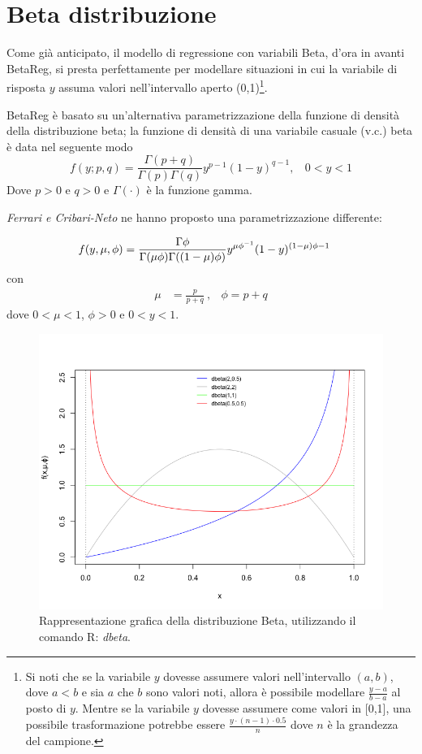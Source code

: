 \documentclass[twoside,twocolumn]{article}
\begin{document}
	\section{Beta distribuzione}
	Come già anticipato, il modello di regressione con variabili Beta, d'ora in avanti BetaReg, si presta perfettamente per modellare situazioni in cui la variabile di risposta $y$ assuma valori nell'intervallo aperto (0,1)\footnote{Si noti che se la variabile $y$ dovesse assumere valori nell'intervallo $(a,b)$, dove $a < b$ e sia $a$ che $b$ sono valori noti, allora è possibile modellare $\frac{y-a}{b-a}$ al posto di $y$. Mentre se la variabile $y$ dovesse assumere come valori in [0,1], una possibile trasformazione potrebbe essere $\frac{y\cdot (n-1) \cdot 0.5}{n}$ dove $n$ è la grandezza del campione.}. 
	
	BetaReg è basato su un'alternativa parametrizzazione della funzione di densità della distribuzione beta;
	la funzione di densità di una variabile casuale (v.c.) beta è data nel seguente modo
	$$f(y;p,q)=\frac{\Gamma(p+q)}{\Gamma(p)\Gamma(q)}y^{p-1}(1-y)^{q-1},\ \ \ \ 0 <y<1$$ 
	Dove $p>0$ e $q>0$ e $\Gamma(\cdot)$ è la funzione gamma. 
	
	\emph{Ferrari e Cribari-Neto} ne hanno proposto una parametrizzazione differente:

	$$
		\hspace{-4mm}
	f(y,\mu,\phi)=\frac{\Gamma{\phi}}{\Gamma(\mu\phi)\Gamma((1-\mu)\phi)}y^{\mu\phi^{-1}}(1-y)^{(1-\mu)\phi-1} $$
	con 
	\begin{align*}
	\mu&=\frac{p}{p+q} \ , & \phi=p+q
	\end{align*}
	dove $0<\mu<1$, $\phi >0 $ e $0<y<1$. 
		\begin{figure}[h]
		\hspace*{-0.5cm}
		\includegraphics[scale=.3]{Beta}
		\caption{Rappresentazione grafica della distribuzione Beta, utilizzando il comando R: \emph{dbeta}.}
	\end{figure}
	
\end{document}
